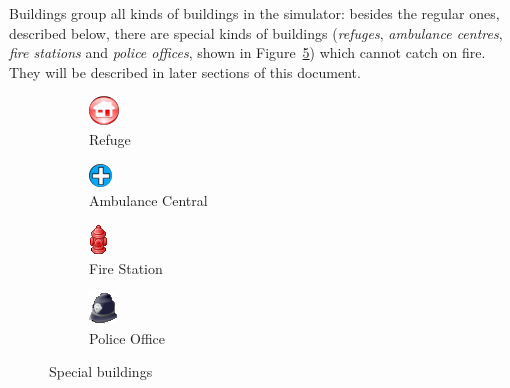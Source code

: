 \documentclass{article}
\begin{document}
Buildings group all kinds of buildings in the simulator: besides the regular ones, described below, there are special kinds of buildings (\emph{refuges}, \emph{ambulance centres}, \emph{fire stations} and \emph{police offices}, shown in Figure~\ref{fig:special_buildings}) which cannot catch on fire. They will be described in later sections of this document.
\begin{figure}[htp]
  \centering
  \begin{subfigure}[hb]{0.45\textwidth}
    \centering
    \includegraphics[scale=0.6]{figs/refuge}
    \caption{Refuge}
    \label{fig:refuge}
  \end{subfigure}
  \begin{subfigure}[hb]{0.45\textwidth}
    \centering
    \includegraphics[scale=0.6]{figs/ambulance_central}
    \caption{Ambulance Central}
    \label{fig:ambulance_central}
  \end{subfigure}

  \begin{subfigure}[hb]{0.45\textwidth}
    \centering
    \includegraphics[scale=0.6]{figs/fire_station}
    \caption{Fire Station}
    \label{fig:fire_station}
  \end{subfigure}
  \begin{subfigure}[hb]{0.45\textwidth}
    \centering
    \includegraphics[scale=0.6]{figs/police_office}
    \caption{Police Office}
    \label{fig:police_office}
  \end{subfigure}

  \caption{Special buildings}
  \label{fig:special_buildings}
\end{figure}
\end{document}
